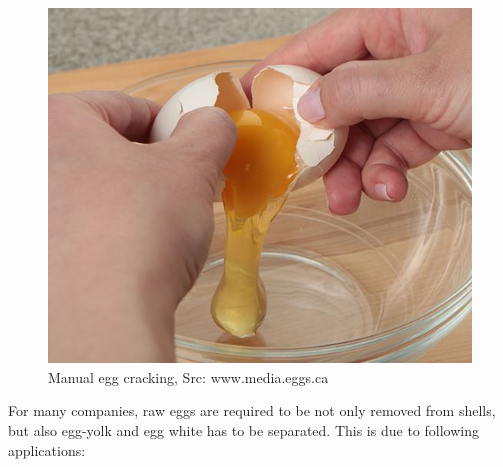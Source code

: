 \documentclass[12pt,twoside,a4paper]{article}
\begin{document}
\begin{figure}[H]
\centering
\includegraphics[width=0.4\paperwidth]{crack}
\caption{Manual egg cracking, Src: www.media.eggs.ca}\label{fig:crack}
\end{figure}

For many companies, raw eggs are required to be not only removed from shells, but also egg-yolk and egg white has to be separated.
This is due to following applications:
\end{document}
